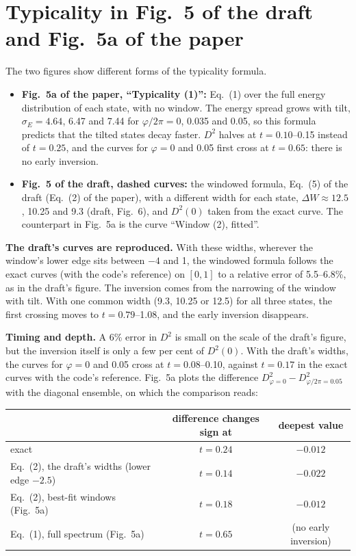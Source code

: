 \documentclass[11pt]{article}
\begin{document}
\section{Typicality in Fig.~5 of the draft and Fig.~5a of the paper}\label{sec:fig5}
The two figures show different forms of the typicality formula.
\begin{itemize}\setlength{\itemsep}{2pt}
\item \textbf{Fig.~5a of the paper, ``Typicality (1)'':} Eq.~(1) over the full energy distribution of each state, with no window. The energy spread grows with tilt, $\sigma_E=4.64$, 6.47 and 7.44 for $\varphi/2\pi=0$, 0.035 and 0.05, so this formula predicts that the tilted states decay faster. $D^2$ halves at $t=0.10$--0.15 instead of $t=0.25$, and the curves for $\varphi=0$ and 0.05 first cross at $t=0.65$: there is no early inversion.
\item \textbf{Fig.~5 of the draft, dashed curves:} the windowed formula, Eq.~(5) of the draft (Eq.~(2) of the paper), with a different width for each state, $\Delta W\approx12.5$, 10.25 and 9.3 (draft, Fig.~6), and $D^2(0)$ taken from the exact curve. The counterpart in Fig.~5a is the curve ``Window (2), fitted''.
\end{itemize}
\textbf{The draft's curves are reproduced.} With these widths, wherever the window's lower edge sits between $-4$ and 1, the windowed formula follows the exact curves (with the code's reference) on $[0,1]$ to a relative error of 5.5--6.8\%, as in the draft's figure. The inversion comes from the narrowing of the window with tilt. With one common width (9.3, 10.25 or 12.5) for all three states, the first crossing moves to $t=0.79$--1.08, and the early inversion disappears.

\textbf{Timing and depth.} A 6\% error in $D^2$ is small on the scale of the draft's figure, but the inversion itself is only a few per cent of $D^2(0)$. With the draft's widths, the curves for $\varphi=0$ and 0.05 cross at $t=0.08$--0.10, against $t=0.17$ in the exact curves with the code's reference. Fig.~5a plots the difference $D^2_{\varphi=0}-D^2_{\varphi/2\pi=0.05}$ with the diagonal ensemble, on which the comparison reads:

\begin{center}\small
\begin{tabular}{lcc}\toprule
 & difference changes sign at & deepest value\\\midrule
exact & $t=0.24$ & $-0.012$\\
Eq.~(2), the draft's widths (lower edge $-2.5$) & $t=0.14$ & $-0.022$\\
Eq.~(2), best-fit windows (Fig.~5a) & $t=0.18$ & $-0.012$\\
Eq.~(1), full spectrum (Fig.~5a) & $t=0.65$ & (no early inversion)\\\bottomrule
\end{tabular}
\end{center}
\end{document}

